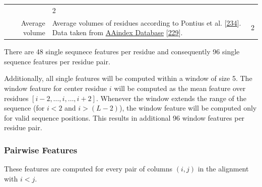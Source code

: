 \documentclass[11pt,a4paper,twoside]{book}
\theoremstyle{definition}
\theoremstyle{definition}
\theoremstyle{remark}
\begin{document}
\begin{longtable}[]{@{}rlc@{}}
\begin{minipage}[t]{0.50\columnwidth}
\end{minipage} & \begin{minipage}[t]{0.18\columnwidth}\centering\strut
2\strut
\end{minipage}\tabularnewline
\begin{minipage}[t]{0.23\columnwidth}\raggedleft\strut
Average volume\strut
\end{minipage} & \begin{minipage}[t]{0.50\columnwidth}\raggedright\strut
Average volumes of residues according to Pontius et al.
{[}\protect\hyperlink{ref-Pontius1996}{234}{]}. Data taken from
\href{http://www.genome.jp/dbget-bin/www_bget?aaindex:PONJ960101}{AAindex
Database} {[}\protect\hyperlink{ref-Kawashima2008}{229}{]}.\strut
\end{minipage} & \begin{minipage}[t]{0.18\columnwidth}\centering\strut
2\strut
\end{minipage}\tabularnewline
\bottomrule
\end{longtable}

There are 48 single sequnece features per residue and consequently 96
single sequence features per residue pair.

Additionally, all single features will be computed within a window of
size 5. The window feature for center residue \(i\) will be computed as
the mean feature over residues
\([i\!-\!2, \ldots, i, \ldots, i\!+\!2]\). Whenever the window extends
the range of the sequence (for \(i\!<\!2\) and \(i\!>\!(L-2)\)), the
window feature will be computed only for valid sequence positions. This
results in additional 96 window features per residue pair.

\subsubsection{Pairwise Features}\label{seq-features-pairwise}

These features are computed for every pair of columns \((i, j)\) in the
alignment with \(i<j\).
\end{document}
